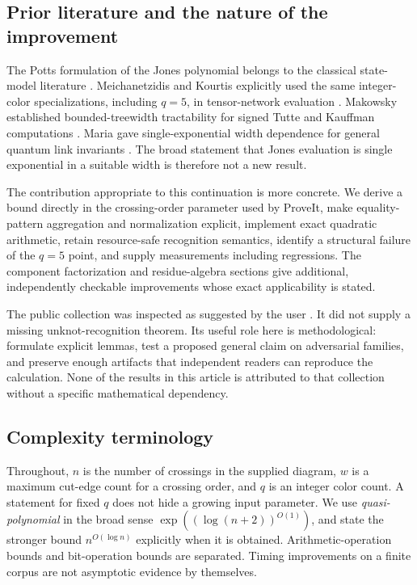 \subsection{Prior literature and the nature of the improvement}

The Potts formulation of the Jones polynomial belongs to the classical
state-model literature \cite{kauffman1987,sokal2005,moffatt2011}.
Meichanetzidis and Kourtis explicitly used the same integer-color
specializations, including $q=5$, in tensor-network evaluation
\cite{meichanetzidis2019}. Makowsky established bounded-treewidth
tractability for signed Tutte and Kauffman computations
\cite{makowsky2005}. Maria gave single-exponential width dependence for
general quantum link invariants \cite{maria2021}. The broad statement
that Jones evaluation is single exponential in a suitable width is therefore
not a new result.

The contribution appropriate to this continuation is more concrete. We
derive a bound directly in the crossing-order parameter used by ProveIt,
make equality-pattern aggregation and normalization explicit, implement exact
quadratic arithmetic, retain resource-safe recognition semantics, identify a
structural failure of the $q=5$ point, and supply measurements including
regressions. The component factorization and residue-algebra sections give
additional, independently checkable improvements whose exact applicability
is stated.

The public  collection was inspected as suggested by the
user \cite{openaimath2026}. It did not supply a missing unknot-recognition
theorem. Its useful role here is methodological: formulate explicit lemmas,
test a proposed general claim on adversarial families, and preserve enough
artifacts that independent readers can reproduce the calculation. None of
the results in this article is attributed to that collection without a
specific mathematical dependency.

\subsection{Complexity terminology}

Throughout, $n$ is the number of crossings in the supplied diagram, $w$ is a
maximum cut-edge count for a crossing order, and $q$ is an integer color
count. A statement for fixed $q$ does not hide a growing input parameter.
We use \emph{quasi-polynomial} in the broad sense
$\exp((\log(n+2))^{O(1)})$, and state the stronger bound
$n^{O(\log n)}$ explicitly when it is obtained. Arithmetic-operation bounds
and bit-operation bounds are separated. Timing improvements on a finite
corpus are not asymptotic evidence by themselves.
